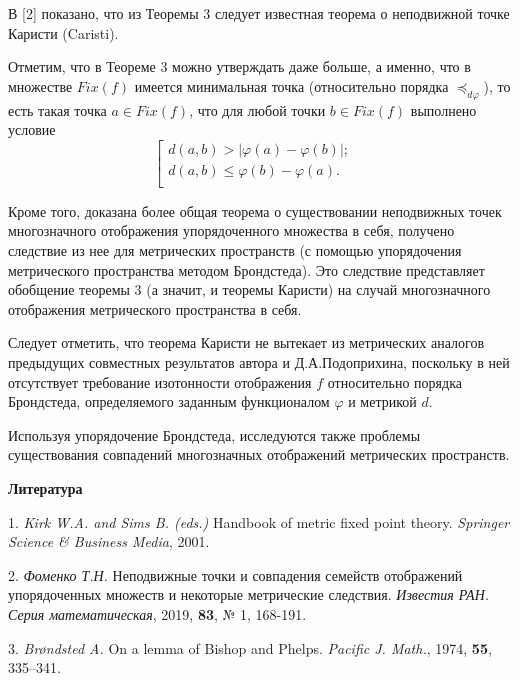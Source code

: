 В [2] показано, что  из Теоремы 3 следует известная теорема о неподвижной точке Каристи (Caristi).

Отметим, что в Теореме 3 можно утверждать даже больше, а именно, что в множестве $Fix(f)$ имеется минимальная точка (относительно порядка $\preceq_{d\varphi}$), то есть такая точка $a\in Fix(f)$, что для любой точки $b\in Fix(f)$ выполнено условие
$$
\left [\begin{array}{rl}d(a,b)>|\varphi(a)-\varphi(b)|;&
\\d(a,b)\le\varphi(b)-\varphi(a).\\
\end{array}
\right.
$$

Кроме того, доказана более общая теорема о существовании неподвижных точек многозначного отображения упорядоченного множества в себя, получено следствие из нее для  метрических пространств (с помощью упорядочения метрического пространства методом Брондстеда). Это следствие представляет обобщение теоремы 3 (а значит, и теоремы Каристи) на случай многозначного отображения метрического пространства в себя.

Следует отметить, что теорема Каристи не вытекает из метрических аналогов предыдущих совместных результатов автора и Д.А.Подоприхина, поскольку в ней отсутствует требование изотонности отображения $f$ относительно порядка Брондстеда, определяемого заданным функционалом $\varphi$ и метрикой $d$.

Используя упорядочение Брондстеда, исследуются также проблемы существования совпадений многозначных отображений метрических пространств.

\smallskip \centerline {\bf Литература} \nopagebreak

1. {\it Kirk W.A. and  Sims B. (eds.)} Handbook of metric fixed point theory. {\it Springer Science \& Business Media},  2001.

2. {\it Фоменко Т.Н.}  Неподвижные точки и совпадения семейств отображений упорядоченных множеств и некоторые метрические следствия. {\it Известия РАН. Серия математическая}, 2019, {\bf 83}, № 1, 168-191.

3. {\it  Br\o ndsted A.} On a lemma of Bishop and Phelps. {\it Pacific J. Math.}, 1974, {\bf 55}, 335--341.
